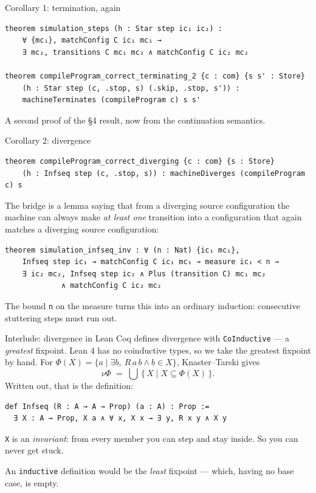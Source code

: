 \documentclass[aspectratio=169,10pt]{beamer}
\newcommand{\code}[1]{\texttt{\small #1}}
\begin{document}
\begin{frame}[fragile]{Corollary 1: termination, again}
\begin{lstlisting}
theorem simulation_steps (h : Star step ic₁ ic₂) :
    ∀ {mc₁}, matchConfig C ic₁ mc₁ →
    ∃ mc₂, transitions C mc₁ mc₂ ∧ matchConfig C ic₂ mc₂

theorem compileProgram_correct_terminating_2 {c : com} {s s' : Store}
    (h : Star step (c, .stop, s) (.skip, .stop, s')) :
    machineTerminates (compileProgram c) s s'
\end{lstlisting}
A second proof of the \S4 result, now from the continuation semantics.
\end{frame}

\begin{frame}[fragile]{Corollary 2: divergence}
\begin{lstlisting}
theorem compileProgram_correct_diverging {c : com} {s : Store}
    (h : Infseq step (c, .stop, s)) : machineDiverges (compileProgram c) s
\end{lstlisting}
The bridge is a lemma saying that from a diverging source configuration the
machine can always make \emph{at least one} transition into a configuration
that again matches a diverging source configuration:
\begin{lstlisting}
theorem simulation_infseq_inv : ∀ (n : Nat) {ic₁ mc₁},
    Infseq step ic₁ → matchConfig C ic₁ mc₁ → measure ic₁ < n →
    ∃ ic₂ mc₂, Infseq step ic₂ ∧ Plus (transition C) mc₁ mc₂
             ∧ matchConfig C ic₂ mc₂
\end{lstlisting}
The bound \code{n} on the measure turns this into an ordinary induction:
consecutive stuttering steps must run out.
\end{frame}

\begin{frame}[fragile]{Interlude: divergence in Lean}
Coq defines divergence with \code{CoInductive} --- a \emph{greatest}
fixpoint.  Lean 4 has no coinductive types, so we take the greatest fixpoint
by hand.  For $\Phi(X) = \{a \mid \exists b,\ R\,a\,b \wedge b \in X\}$,
Knaster--Tarski gives
\[ \nu\Phi \;=\; \bigcup\,\{\,X \mid X \subseteq \Phi(X)\,\}. \]
Written out, that is the definition:
\begin{lstlisting}
def Infseq (R : A → A → Prop) (a : A) : Prop :=
  ∃ X : A → Prop, X a ∧ ∀ x, X x → ∃ y, R x y ∧ X y
\end{lstlisting}
\code{X} is an \emph{invariant}: from every member you can step and stay
inside.  So you can never get stuck.
\medskip

An \code{inductive} definition would be the \emph{least} fixpoint --- which,
having no base case, is empty.
\end{frame}
\end{document}
